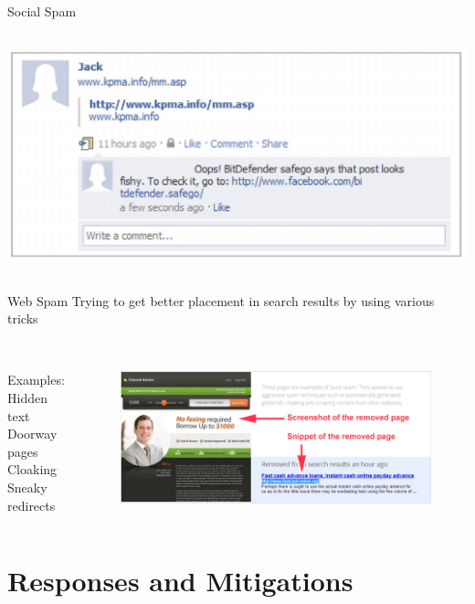 \documentclass[nobackground,dvipsnames,table]{beamer}
\begin{document}
\begin{frame}{Social Spam}
\begin{columns}
            \includegraphics[width=\textwidth]{facebook-spam}
    \end{columns}
\end{frame}

\begin{frame}{Web Spam}
    Trying to get better placement in search results by using various tricks\\~\\
    \begin{columns}
            Examples:\\
            Hidden text\\ 
            Doorway pages\\ 
            Cloaking\\
            Sneaky redirects
            \begin{figure}
                \includegraphics[width=\textwidth, right]{fastcash}
            \end{figure}
    \end{columns}
\end{frame}

\section{Responses and Mitigations}
\end{document}

